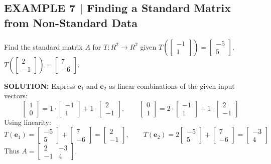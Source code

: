 \documentclass{article}
\theoremstyle{mystyle}
\begin{document}
\subsection*{EXAMPLE 7 | Finding a Standard Matrix from Non-Standard Data}
Find the standard matrix $A$ for $T:R^2\to R^2$ given
$T\!\left(\begin{bmatrix}-1\\1\end{bmatrix}\right)=\begin{bmatrix}-5\\5\end{bmatrix}$,\;
$T\!\left(\begin{bmatrix}2\\-1\end{bmatrix}\right)=\begin{bmatrix}7\\-6\end{bmatrix}$.

\textbf{SOLUTION:} Express $\mathbf{e}_1$ and $\mathbf{e}_2$ as linear combinations of the given input vectors:
\[
\begin{bmatrix}1\\0\end{bmatrix}=1\cdot\begin{bmatrix}-1\\1\end{bmatrix}+1\cdot\begin{bmatrix}2\\-1\end{bmatrix},\qquad
\begin{bmatrix}0\\1\end{bmatrix}=2\cdot\begin{bmatrix}-1\\1\end{bmatrix}+1\cdot\begin{bmatrix}2\\-1\end{bmatrix}
\]
Using linearity:
\[
T(\mathbf{e}_1)=\begin{bmatrix}-5\\5\end{bmatrix}+\begin{bmatrix}7\\-6\end{bmatrix}=\begin{bmatrix}2\\-1\end{bmatrix},\qquad
T(\mathbf{e}_2)=2\begin{bmatrix}-5\\5\end{bmatrix}+\begin{bmatrix}7\\-6\end{bmatrix}=\begin{bmatrix}-3\\4\end{bmatrix}
\]
Thus $A=\begin{bmatrix}2&-3\\-1&4\end{bmatrix}$.
\end{document}
